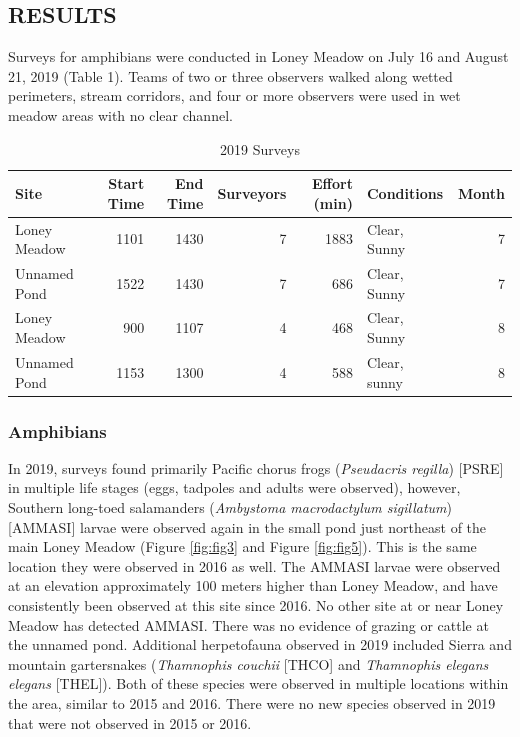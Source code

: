 \documentclass[11pt,a4paper,]{article}
\begin{document}
\hypertarget{results}{%
\subsection{RESULTS}\label{results}}

Surveys for amphibians were conducted in Loney Meadow on July 16 and August 21, 2019 (Table 1). Teams of two or three observers walked along wetted perimeters, stream corridors, and four or more observers were used in wet meadow areas with no clear channel.

\begin{table}

\caption{\label{tab:table1}2019 Surveys}
\centering
\begin{tabular}[t]{l|r|r|r|r|l|r}
\hline
Site & Start Time & End Time & Surveyors & Effort (min) & Conditions & Month\\
\hline
Loney Meadow & 1101 & 1430 & 7 & 1883 & Clear, Sunny & 7\\
\hline
Unnamed Pond & 1522 & 1430 & 7 & 686 & Clear, Sunny & 7\\
\hline
Loney Meadow & 900 & 1107 & 4 & 468 & Clear, Sunny & 8\\
\hline
Unnamed Pond & 1153 & 1300 & 4 & 588 & Clear, sunny & 8\\
\hline
\end{tabular}
\end{table}

\hypertarget{amphibians}{%
\subsubsection{Amphibians}\label{amphibians}}

In 2019, surveys found primarily Pacific chorus frogs (\emph{Pseudacris regilla}) {[}PSRE{]} in multiple life stages (eggs, tadpoles and adults were observed), however, Southern long-toed salamanders (\emph{Ambystoma macrodactylum sigillatum}) {[}AMMASI{]} larvae were observed again in the small pond just northeast of the main Loney Meadow (Figure \ref{fig:fig3} and Figure \ref{fig:fig5}). This is the same location they were observed in 2016 as well. The AMMASI larvae were observed at an elevation approximately 100 meters higher than Loney Meadow, and have consistently been observed at this site since 2016. No other site at or near Loney Meadow has detected AMMASI. There was no evidence of grazing or cattle at the unnamed pond. Additional herpetofauna observed in 2019 included Sierra and mountain gartersnakes (\emph{Thamnophis couchii} {[}THCO{]} and \emph{Thamnophis elegans elegans} {[}THEL{]}). Both of these species were observed in multiple locations within the area, similar to 2015 and 2016. There were no new species observed in 2019 that were not observed in 2015 or 2016.
\end{document}
